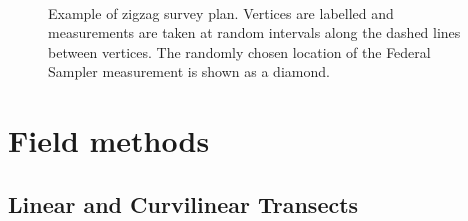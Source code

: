 \documentclass{sfuthesis}
\begin{document}
\begin{figure}
	\centering
	\\
	\caption{Example of zigzag survey plan. Vertices are labelled and measurements are taken at random intervals along the dashed lines between vertices. The randomly chosen location of the Federal Sampler measurement is shown as a diamond.}
	\label{zigzag_vertex}
\end{figure}


\section{Field methods}

\subsection{Linear and Curvilinear Transects}
\label{sec:transects}
\end{document}

